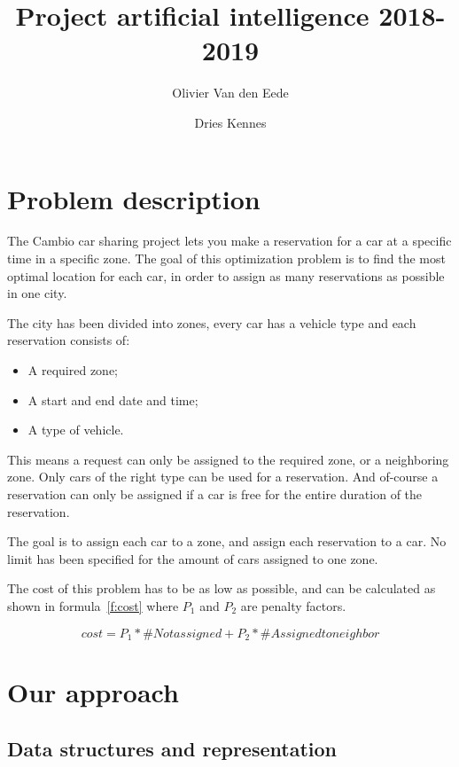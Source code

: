 \documentclass[11pt]{article}
\begin{document}
\title{Project artificial intelligence 2018-2019}
\author[1]{Olivier Van den Eede}
\author[1]{Dries Kennes}
\date{}
\maketitle

\section{Problem description}
    The Cambio car sharing project lets you make a reservation for a car at a specific time in a specific zone.
    The goal of this optimization problem is to find the most optimal location for each car, in order to assign as many reservations as possible
    in one city.
    
    The city has been divided into zones, every car has a vehicle type and each reservation consists of:
    \begin{itemize}
        \item A required zone;
        \item A start and end date and time;
        \item A type of vehicle.
    \end{itemize} 

    This means a request can only be assigned to the required zone, or a neighboring zone. Only cars of the right type can be used for a reservation.
    And of-course a reservation can only be assigned if a car is free for the entire duration of the reservation.

    The goal is to assign each car to a zone, and assign each reservation to a car. No limit has been specified for the amount of cars assigned to one zone.

    The cost of this problem has to be as low as possible, and can be calculated as shown in formula~\ref{f:cost} where $P_1$ and $P_2$ are penalty factors.

    \begin{equation}
        \label{f:cost}
        cost = P_1 * \#Not assigned + P_2 * \#Assigned to neighbor
    \end{equation}

\section{Our approach}
    \subsection{Data structures and representation}
\end{document}
